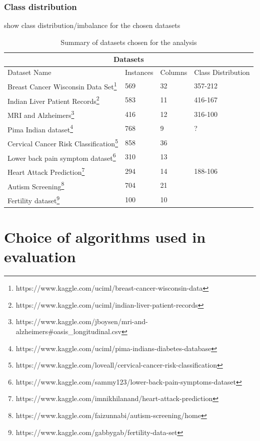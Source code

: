 \subsubsection{Class distribution}
show class distribution/imbalance for the chosen datasets
\begin{table}
\begin{tabular}{ |p{5cm}|p{1.5cm}| p{1.5cm} | p{2 cm}|}
 \hline
 \multicolumn{4}{|c|}{Datasets} \\
 \hline
 Dataset Name & Instances & Columns & Class Distribution \\
 \hline
 Breast Cancer Wisconsin Data Set\footnote{https://www.kaggle.com/uciml/breast-cancer-wisconsin-data}  & 569 & 32 & 
357-212\\
Indian Liver Patient Records\footnote{https://www.kaggle.com/uciml/indian-liver-patient-records} &  583 & 11  & 416-167 \\
MRI and Alzheimers\footnote{https://www.kaggle.com/jboysen/mri-and-alzheimers\#oasis\_longitudinal.csv} & 416 & 12 & 316-100\\
Pima Indian dataset\footnote{https://www.kaggle.com/uciml/pima-indians-diabetes-database} & 768 & 9  & ?\\
Cervical Cancer Risk Classification\footnote{https://www.kaggle.com/loveall/cervical-cancer-risk-classification  } & 858 &  36 & \\
Lower back pain symptom dataset\footnote{ https://www.kaggle.com/sammy123/lower-back-pain-symptoms-dataset} & 310 & 13  & \\
Heart Attack Prediction\footnote{https://www.kaggle.com/imnikhilanand/heart-attack-prediction} & 294 & 14  & 188-106\\
Autism Screening\footnote{https://www.kaggle.com/faizunnabi/autism-screening/home} &704 & 21 & \\
Fertility dataset\footnote{https://www.kaggle.com/gabbygab/fertility-data-set} &100  & 10 & \\
 \hline
\end{tabular}
\caption{Summary of datasets chosen for the analysis}
\label{table:1}
\end{table}

\section{Choice of algorithms used in evaluation}
